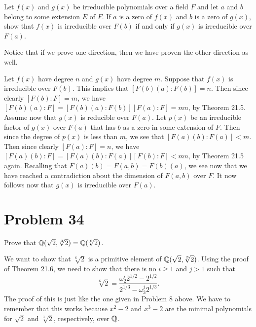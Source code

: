 \documentclass{article}
\begin{document}
Let $f(x)$ and $g(x)$ be irreducible polynomials over a field $F$ and let $a$
and $b$ belong to some extension $E$ of $F$.  If $a$ is a zero of $f(x)$ and $b$
is a zero of $g(x)$, show that $f(x)$ is irreducible over $F(b)$ if and only if
$g(x)$ is irreducible over $F(a)$.

Notice that if we prove one direction, then we have proven the other direction as well.

Let $f(x)$ have degree $n$ and $g(x)$ have degree $m$.
Suppose that $f(x)$ is irreducible over $F(b)$.  This implies
that $[F(b)(a):F(b)]=n$.  Then since clearly $[F(b):F]=m$,
we have $[F(b)(a):F]=[F(b)(a):F(b)][F(a):F]=mn$, by Theorem 21.5.
Assume now that $g(x)$ is reducible over $F(a)$.  Let $p(x)$ be an
irreducible factor of $g(x)$ over $F(a)$ that has $b$ as a zero in some extension of $F$.
Then since the degree of $p(x)$ is less than $m$, we see that
$[F(a)(b):F(a)]<m$.  Then since clearly $[F(a):F]=n$,
we have $[F(a)(b):F]=[F(a)(b):F(a)][F(b):F]<mn$, by Theorem 21.5 again.
Recalling that $F(a)(b)=F(a,b)=F(b)(a)$, we see now that we
have reached a contradiction about the dimension of $F(a,b)$ over $F$.
It now follows now that $g(x)$ is irreducible over $F(a)$.

\section*{Problem 34}

Prove that $\mathbb{Q}(\sqrt{2},\sqrt[3]{2})=\mathbb{Q}(\sqrt[6]{2})$.

We want to show that $\sqrt[6]{2}$ is a primitive element of $\mathbb{Q}(\sqrt{2},\sqrt[3]{2})$.
Using the proof of Theorem 21.6, we need to show that there is no $i\geq 1$ and $j>1$
such that
\begin{equation*}
\sqrt[6]{2}=\frac{\omega_2^i2^{1/2}-2^{1/2}}{2^{1/3}-\omega_3^j2^{1/3}}.
\end{equation*}
The proof of this is just like the one given in Problem 8 above.  We have to remember
that this works because $x^2-2$ and $x^3-2$ are the minimal polynomials for $\sqrt{2}$
and $\sqrt[3]{2}$, respectively, over $\mathbb{Q}$.
\end{document}
